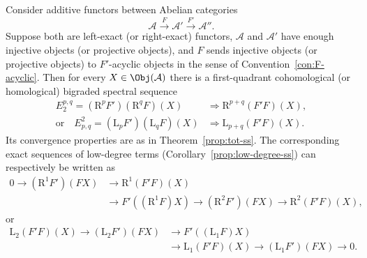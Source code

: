 \begin{theorem}
\label{prop:Grothendieck-ss}
	Consider additive functors between Abelian categories
	\[ \mathcal{A} \xrightarrow{F} \mathcal{A}' \xrightarrow{F'} \mathcal{A}''. \]
	Suppose both are left-exact (or right-exact) functors, $\mathcal{A}$ and
	$\mathcal{A}'$ have enough injective objects (or projective objects), and
	$F$ sends injective objects (or projective objects) to $F'$-acyclic objects
	in the sense of Convention~\ref{con:F-acyclic}. Then for every
	$X\in\Obj(\mathcal{A})$ there is a first-quadrant cohomological (or
	homological) bigraded spectral sequence
	\begin{align*}
		E_2^{p,q} = (\mathrm{R}^p F') (\mathrm{R}^q F)(X) & \Rightarrow \mathrm{R}^{p+q} (F'F)(X), \\
		\text{or} \quad E^2_{p,q} = (\mathrm{L}_p F') (\mathrm{L}_q F)(X) & \Rightarrow \mathrm{L}_{p+q}(F'F)(X).
	\end{align*}
	Its convergence properties are as in Theorem~\ref{prop:tot-ss}. The
	corresponding exact sequences of low-degree terms
	(Corollary~\ref{prop:low-degree-ss}) can respectively be written as
	\begin{equation*}\begin{split}
		0 \to (\mathrm{R}^1 F')(FX) & \to \mathrm{R}^1(F'F)(X) \\
		& \to F'\left( (\mathrm{R}^1 F)X \right) \to (\mathrm{R}^2 F')(FX) \to \mathrm{R}^2(F'F)(X),
	\end{split}\end{equation*}
	or
	\begin{equation*}\begin{split}
		\mathrm{L}_2(F'F)(X) \to (\mathrm{L}_2 F')(FX) & \to F'\left( (\mathrm{L}_1 F)X \right) \\
		& \to \mathrm{L}_1(F'F)(X) \to (\mathrm{L}_1 F')(FX) \to 0.
	\end{split}\end{equation*}
\end{theorem}
